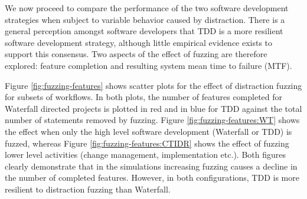 \documentclass{llncs}
\begin{document}

We now proceed to compare the performance of the two software development strategies when subject to variable behavior
caused by distraction.  There is a general perception amongst software developers that TDD is a more resilient software
development strategy, although little empirical evidence exists to support this consensus.  Two aspects of the effect of
fuzzing are therefore explored: feature completion and resulting system mean time to failure (MTF).

Figure \ref{fig:fuzzing-features} shows scatter plots for the effect of distraction fuzzing for subsets of workflows.
In both plots, the number of features completed for Waterfall directed projects is plotted in red and in blue for TDD
against the total number of statements removed by fuzzing.  Figure \ref{fig:fuzzing-features:WT} shows the effect when
only the high level software development (Waterfall or TDD) is fuzzed, whereas Figure \ref{fig:fuzzing-features:CTIDR}
shows the effect of fuzzing lower level activities (change management, implementation etc.).  Both figures clearly
demonstrate that in the simulations increasing fuzzing causes a decline in the number of completed features.  However,
in both configurations, TDD is more resilient to distraction fuzzing than Waterfall.
\end{document}
